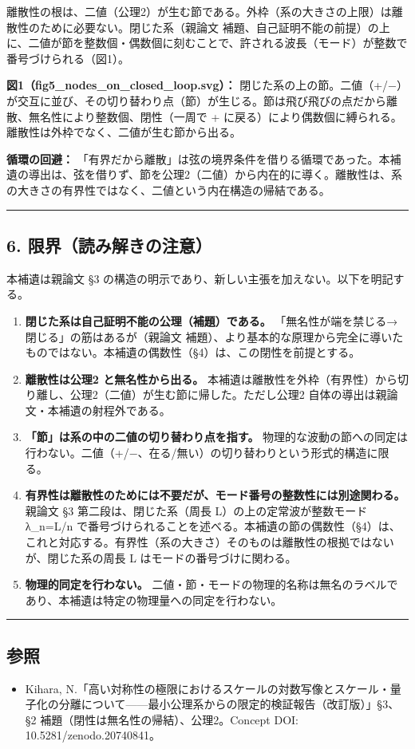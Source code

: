 \documentclass[11pt]{ltjsarticle}
\providecommand{\tightlist}{\setlength{\itemsep}{0pt}\setlength{\parskip}{0pt}}
\begin{document}
離散性の根は、二値（公理2）が生む節である。外枠（系の大きさの上限）は離散性のために必要ない。閉じた系（親論文
補題、自己証明不能の前提）の上に、二値が節を整数個・偶数個に刻むことで、許される波長（モード）が整数で番号づけられる（図1）。

\textbf{図1（fig5\_nodes\_on\_closed\_loop.svg）：}
閉じた系の上の節。二値（+/−）が交互に並び、その切り替わり点（節）が生じる。節は飛び飛びの点だから離散、無名性により整数個、閉性（一周で
+
に戻る）により偶数個に縛られる。離散性は外枠でなく、二値が生む節から出る。

\textbf{循環の回避：}
「有界だから離散」は弦の境界条件を借りる循環であった。本補遺の導出は、弦を借りず、節を公理2（二値）から内在的に導く。離散性は、系の大きさの有界性ではなく、二値という内在構造の帰結である。

\begin{center}\rule{0.5\linewidth}{0.5pt}\end{center}

\subsection{6.
限界（読み解きの注意）}\label{ux9650ux754cux8aadux307fux89e3ux304dux306eux6ce8ux610f}

本補遺は親論文 §3
の構造の明示であり、新しい主張を加えない。以下を明記する。

\begin{enumerate}
\def\labelenumi{\arabic{enumi}.}
\item
  \textbf{閉じた系は自己証明不能の公理（補題）である。}
  「無名性が端を禁じる→閉じる」の筋はあるが（親論文
  補題）、より基本的な原理から完全に導いたものではない。本補遺の偶数性（§4）は、この閉性を前提とする。
\item
  \textbf{離散性は公理2 と無名性から出る。}
  本補遺は離散性を外枠（有界性）から切り離し、公理2（二値）が生む節に帰した。ただし公理2
  自体の導出は親論文・本補遺の射程外である。
\item
  \textbf{「節」は系の中の二値の切り替わり点を指す。}
  物理的な波動の節への同定は行わない。二値（+/−、在る/無い）の切り替わりという形式的構造に限る。
\item
  \textbf{有界性は離散性のためには不要だが、モード番号の整数性には別途関わる。}
  親論文 §3 第二段は、閉じた系（周長 L）の上の定常波が整数モード
  λ\_n=L/n
  で番号づけられることを述べる。本補遺の節の偶数性（§4）は、これと対応する。有界性（系の大きさ）そのものは離散性の根拠ではないが、閉じた系の周長
  L はモードの番号づけに関わる。
\item
  \textbf{物理的同定を行わない。}
  二値・節・モードの物理的名称は無名のラベルであり、本補遺は特定の物理量への同定を行わない。
\end{enumerate}

\begin{center}\rule{0.5\linewidth}{0.5pt}\end{center}

\subsection{参照}\label{ux53c2ux7167}

\begin{itemize}
\tightlist
\item
  Kihara,
  N.「高い対称性の極限におけるスケールの対数写像とスケール・量子化の分離について------最小公理系からの限定的検証報告（改訂版）」§3、§2
  補題（閉性は無名性の帰結）、公理2。Concept DOI:
  10.5281/zenodo.20740841。
\end{itemize}
\end{document}
